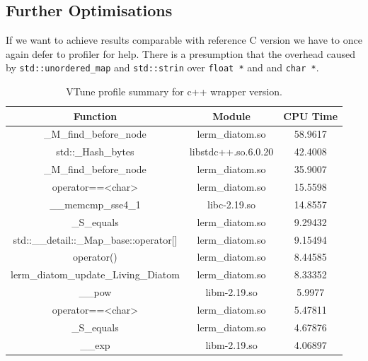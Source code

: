 \documentclass[12pt, a4paper]{report}
\begin{document}
\subsection{Further Optimisations}\label{subsec:further-opt}
If we want to achieve results comparable with reference C version we have to once again
defer to profiler for help. There is a presumption that the overhead caused by
\lstinline{std::unordered_map} and \lstinline{std::strin} over \lstinline{float *} and
and \lstinline{char *}.

\begin{table}
  \begin{center}
    \begin{tabular}{|c|c||c|}
    \hline
    Function                                 & Module              & CPU Time               \\ \hline
    \rowcolor{babyblue}
    \_M\_find\_before\_node                  & lerm\_diatom.so     & 58.9617 \\
    \rowcolor{babyblue}
    std::\_Hash\_bytes                       & libstdc++.so.6.0.20 & 42.4008  \\
    \rowcolor{babyblue}
    \_M\_find\_before\_node                  & lerm\_diatom.so     & 35.9007 \\
    \rowcolor{babyblue}
    operator==\textless char\textgreater     & lerm\_diatom.so     & 15.5598 \\
    \rowcolor{babyblue}
    \_\_memcmp\_sse4\_1                      & libc-2.19.so        & 14.8557         \\
    \rowcolor{babyblue}
    \_S\_equals                              & lerm\_diatom.so     & 9.29432 \\
    \rowcolor{babyblue}
    std::\_\_detail::\_Map\_base::operator[] & lerm\_diatom.so     & 9.15494 \\
    \rowcolor{babyblue}
    operator()                               & lerm\_diatom.so     & 8.44585 \\
    lerm\_diatom\_update\_Living\_Diatom     & lerm\_diatom.so     & 8.33352 \\
    \_\_pow                                  & libm-2.19.so        & 5.9977          \\
    \rowcolor{babyblue}
    operator==\textless char\textgreater     & lerm\_diatom.so     & 5.47811 \\
    \rowcolor{babyblue}
    \_S\_equals                              & lerm\_diatom.so     & 4.67876 \\
    \_\_exp                                  & libm-2.19.so        & 4.06897       \\ \hline
    \end{tabular}
    \caption {VTune profile summary for c++ wrapper version.}
    \label{table:vtune-gil-free-profile}
  \end{center}
\end{table}
\end{document}
